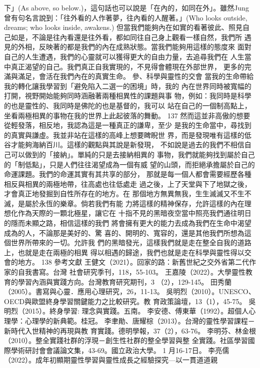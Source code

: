 下」(As above, so below.)，這句話也可以說是「在內的，如同在外」。雖然Jung
曾有句名言說到：「往外看的人作著夢，往內看的人醒著。」(Who looks outside, 
dreams; who looks inside, awakens.) 但當我們能夠內在如實的看著彼此、照見自
己如是，不論是往內看還是往外看，都如同往自己身上觀看一樣自然，我們所
遇見的外相，反映著的都是我們的內在成熟狀態。當我們能夠用這樣的態度來
面對自己的人生遭遇，我們的心靈就可以獲得更大的自由力量，去追尋我們在
人生當中真正渴望的自己。我們真正自我實現的，不見得會體現在外部世界，
更多的完滿與滿足，會活在我們內在的真實生命。 
參、科學與靈性的交會 
當我的生命帶給我的轉化讓我學習到「避免陷入二選一的困境」時，我的
內在世界同時被寬幅的打開，視野開始能夠同時涵融著兩種相異性的課題與事
物，例如：我同時是科學的也是靈性的、我同時是佛陀的也是基督的，我可以
站在自己的一個制高點上，坐看兩極相異的事物在我的世界上此起彼落的舞動。
137 
然而這並非高傲的想要從輕發落，相反地，我認為這是一種真正的謙卑，至少
是我的生命當中，尋找到的真實與謙虛。我並非站在這樣的高峰上想要睥睨世
界，而是發現唯有這樣的低谷才能夠海納百川。這樣的觀點與其說是新發現，
不如說是過去的我們不相信自己可以做到的「接納」。單純的只是去接納相異的
事物，我們就能夠找到屬於自己的「制低點」，只是人們往往渴望成為一個有威
望的山頭，而拒絕承擔屬於自己的命運課題。我們的命運其實有其共享的部分，
那就是每一個人都會需要經歷各種相反與相異的兩極地帶，往高處也往低處走
過之後，上了天堂與下了地獄之後，才會真正地發掘到自性所存在的地方。在
那個地方無異無我，生生滅滅又不生不滅，是屬於永恆的樂章。倘若我們有能
力將這樣的精神保存，允許這樣的內在理想化作為天際的一顆北極星，讓它在
十指不見的黑暗夜空當中照亮我們通往明日的隱而未顯之路，相信這樣的我們
將會擁有更大的能力去成為我們在生命中渴望成為的人，不論那是美好的、驚
喜的、開明的、寬容的，還是其他我們所想為這個世界所帶來的一切。允許我
們的黑暗發光，這樣我們就是走在整全自我的道路上，也就是走在兩極的相異
得以相遇的歸途，我們也就是走在科學與靈性得以交會的地方。 
138 
參考文獻 
王健文（2021）。回家的路：新舊世紀之交外省第二代作家的自我書寫。台灣
社會研究季刊，118，55-103。 
王嘉陵（2022）。大學靈性教育的學習內涵與實踐方向。台灣教育研究期刊，3
（2），129-145。 
田秀蘭（2005）。書寫與心靈．應用心理研究，26，11-13。 
吳明烈（2010）。UNESCO、OECD與歐盟終身學習關鍵能力之比較研究。教
育政策論壇，13（1），45-75。 
吳明烈（2015）。終身學習: 理念與實踐。五南。 
李安德、傅東華（1992）。超個人心理學：心理學的新典範。桂冠。 
李聿勛、唐耀棕（2013）。台灣的靈性學習課程－新時代入世精神的再現與教
育實踐。德明學報，37（2），63-76。 
李明芬、林金根（2010）。整全實踐社群的浮現－創生性社群的整全學習與整
全實踐。社區學習國際學術研討會會議論文集，43-69。國立政治大學。
1 月16-17日。 
李亮儒（2022）。成年初顯期靈性學習與靈性成長之經驗探究—以一貫道道親
